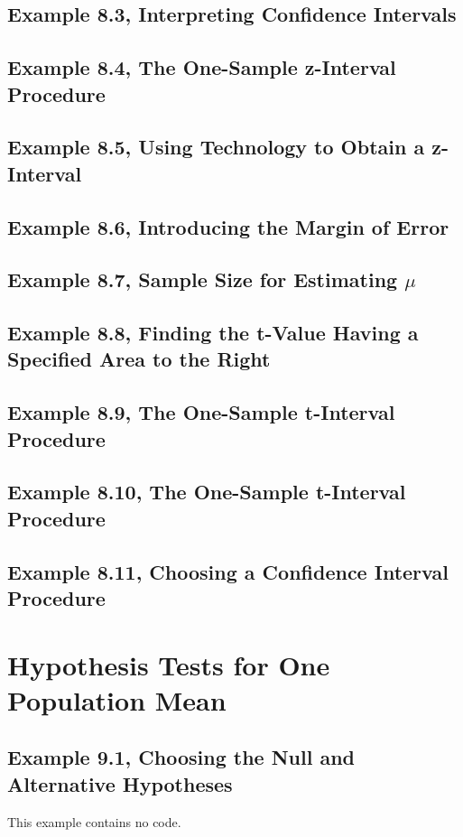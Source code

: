 \documentclass{article}\usepackage[]{graphicx}\usepackage[]{color}
\begin{document}
\subsection{Example 8.3, Interpreting Confidence Intervals}

\subsection{Example 8.4, The One-Sample z-Interval Procedure}
\subsection{Example 8.5, Using Technology to Obtain a z-Interval}
\subsection{Example 8.6, Introducing the Margin of Error}
\subsection{Example 8.7, Sample Size for Estimating $\mu{}$}
\subsection{Example 8.8, Finding the t-Value Having a Specified Area to the Right}
\subsection{Example 8.9, The One-Sample t-Interval Procedure}
\subsection{Example 8.10, The One-Sample t-Interval Procedure}
\subsection{Example 8.11, Choosing a Confidence Interval Procedure}

\section{Hypothesis Tests for One Population Mean}

\subsection{Example 9.1, Choosing the Null and Alternative Hypotheses}This example contains no code.
\end{document}
